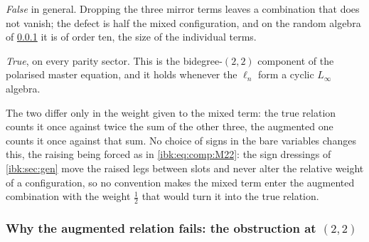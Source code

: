 \begin{description}
  \setlength{\itemsep}{0.8ex}

  \item[Augmented --- the first four terms alone.] \emph{False} in general. Dropping the three mirror terms leaves a combination that does not vanish; the defect is half the mixed configuration, and on the random algebra of \cref{ibk:sec:comp:obstruction} it is of order ten, the size of the individual terms.

  \item[Non-augmented --- all seven terms.] \emph{True}, on every parity sector. This is the bidegree-$(2,2)$ component of the polarised master equation, and it holds whenever the $\ell_n$ form a cyclic $L_\infty$ algebra.
\end{description}
The two differ only in the weight given to the mixed term: the true relation counts it once against twice the sum of the other three, the augmented one counts it once against that sum. No choice of signs in the bare variables changes this, the raising being forced as in \eqref{ibk:eq:comp:M22}: the sign dressings of \cref{ibk:sec:gen} move the raised legs between slots and never alter the relative weight of a configuration, so no convention makes the mixed term enter the augmented combination with the weight $\tfrac12$ that would turn it into the true relation.

\subsubsection{Why the augmented relation fails: the obstruction at \texorpdfstring{$(2,2)$}{(2,2)}}
\label{ibk:sec:comp:obstruction}

